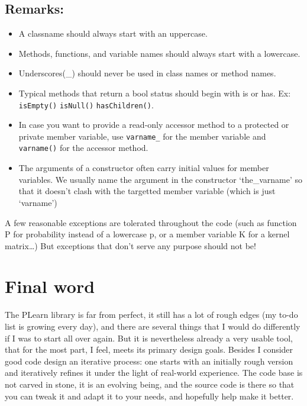 \documentclass[11pt]{book}
\begin{document}
\subsection*{Remarks:}

\begin{itemize}
\item  A classname should always start with an uppercase.
\item  Methods, functions, and variable names should always start with a lowercase.
\item  Underscores(\_) should never be used in class names or method names.
\item  Typical methods that return a bool status should begin with is or has. Ex: {\tt isEmpty()} {\tt isNull()} {\tt hasChildren()}.
\item  In case you want to provide a read-only accessor method to a protected or private member variable, use {\tt varname\_} for the member variable and {\tt varname()} for the accessor method.
\item  The arguments of a constructor often carry initial values for member variables. We usually name the argument in the constructor `the\_varname' so that it doesn't clash with the targetted member variable (which is just `varname')

\end{itemize}

 A few reasonable exceptions are tolerated throughout the code (such as
function P for probability instead of a lowercase p, or a member
variable K for a kernel matrix\ldots) But exceptions that don't serve
any purpose should not be!

\section{Final word}

 The PLearn library is far from perfect, it still has a lot of
rough edges (my to-do list is growing every day), and there are
several things that I would do differently if I was to start all
over again. But it is nevertheless already a very usable tool, that
for the most part, I feel, meets its primary design goals. Besides I
consider good code design an iterative process: one starts with an
initially rough version and iteratively refines it under the light
of real-world experience. The code base is not carved in stone, it
is an evolving being, and the source code is there so that you can
tweak it and adapt it to your needs, and hopefully help make it better.
\end{document}
